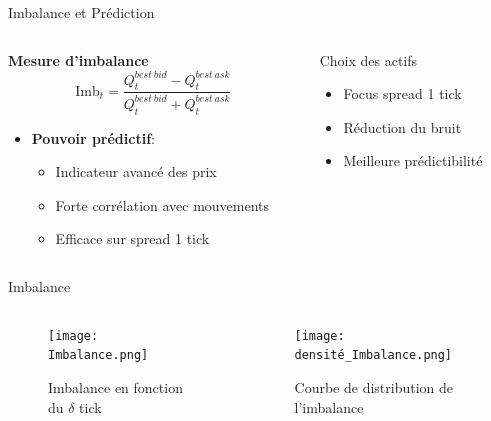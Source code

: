 \documentclass[aspectratio=169]{beamer}  %
\begin{document}
\begin{frame}{Imbalance et Prédiction}
    \begin{columns}
        \begin{column}{0.6\textwidth}
            \textbf{Mesure d'imbalance}
            \begin{equation*}
                \text{Imb}_t = \frac{Q^{best\ bid}_t-Q^{best\ ask}_t}{Q^{best\ bid}_t+Q^{best\ ask}_t}
            \end{equation*}
            \begin{itemize}
                \item \textbf{Pouvoir prédictif}:
                \begin{itemize}
                    \item Indicateur avancé des prix
                    \item Forte corrélation avec mouvements
                    \item Efficace sur spread 1 tick
                \end{itemize}
            \end{itemize}
        \end{column}
        \begin{column}{0.4\textwidth}
            \begin{alertblock}{Choix des actifs}
                \begin{itemize}
                    \item Focus spread 1 tick
                    \item Réduction du bruit
                    \item Meilleure prédictibilité
                \end{itemize}
            \end{alertblock}
        \end{column}
    \end{columns}
\end{frame}

\begin{frame}{Imbalance}
    \begin{columns}
        \begin{column}{0.48\textwidth}
            \begin{figure}
                \centering
                \texttt{[image: Imbalance.png]}
                \caption{Imbalance en fonction du $\delta$ tick}
            \end{figure}
        \end{column}
        \begin{column}{0.48\textwidth}
            \begin{figure}
                \centering
                \texttt{[image: densité\_Imbalance.png]}
                \caption{Courbe de distribution de l'imbalance}
            \end{figure}
        \end{column}
    \end{columns}
\end{frame}
\end{document}
